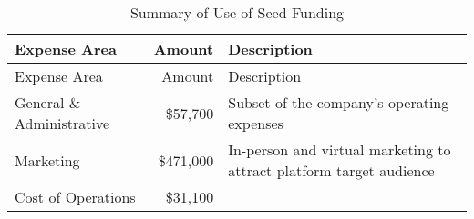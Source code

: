 \documentclass[10pt,openany]{book}
\begin{document}
\begin{longtable}[]{@{}lrl@{}}
\caption{Summary of Use of Seed Funding}\tabularnewline
\toprule
\begin{minipage}[b]{0.28\columnwidth}\raggedright
Expense Area\strut
\end{minipage} & \begin{minipage}[b]{0.13\columnwidth}\raggedleft
Amount\strut
\end{minipage} & \begin{minipage}[b]{0.50\columnwidth}\raggedright
Description\strut
\end{minipage}\tabularnewline
\midrule
\endfirsthead
\toprule
\begin{minipage}[b]{0.28\columnwidth}\raggedright
Expense Area\strut
\end{minipage} & \begin{minipage}[b]{0.13\columnwidth}\raggedleft
Amount\strut
\end{minipage} & \begin{minipage}[b]{0.50\columnwidth}\raggedright
Description\strut
\end{minipage}\tabularnewline
\midrule
\endhead
\begin{minipage}[t]{0.28\columnwidth}\raggedright
General \& Administrative\strut
\end{minipage} & \begin{minipage}[t]{0.13\columnwidth}\raggedleft
\$57,700\strut
\end{minipage} & \begin{minipage}[t]{0.50\columnwidth}\raggedright
Subset of the company's operating expenses\strut
\end{minipage}\tabularnewline
\begin{minipage}[t]{0.28\columnwidth}\raggedright
Marketing\strut
\end{minipage} & \begin{minipage}[t]{0.13\columnwidth}\raggedleft
\$471,000\strut
\end{minipage} & \begin{minipage}[t]{0.50\columnwidth}\raggedright
In-person and virtual marketing to attract platform target
audience\strut
\end{minipage}\tabularnewline
\begin{minipage}[t]{0.28\columnwidth}\raggedright
Cost of Operations\strut
\end{minipage} & \begin{minipage}[t]{0.13\columnwidth}\raggedleft
\$31,100\strut
\end{minipage} & \begin{minipage}[t]{0.50\columnwidth}\raggedright

\end{minipage}
\end{longtable}
\end{document}
